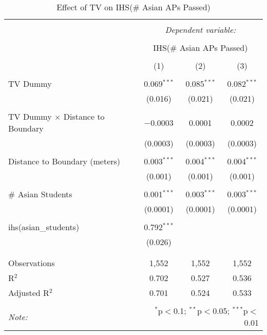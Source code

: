 
\begin{table}[!htbp] \centering 
  \caption{Effect of TV on IHS(\# Asian APs Passed)} 
  \label{} 
\begin{tabular}{@{\extracolsep{-2pt}}lccc} 
\\[-1.8ex]\hline 
\hline \\[-1.8ex] 
 & \multicolumn{3}{c}{\textit{Dependent variable:}} \\ 
\cline{2-4} 
\\[-1.8ex] & \multicolumn{3}{c}{IHS(\# Asian APs Passed)} \\ 
\\[-1.8ex] & (1) & (2) & (3)\\ 
\hline \\[-1.8ex] 
 TV Dummy & 0.069$^{***}$ & 0.085$^{***}$ & 0.082$^{***}$ \\ 
  & (0.016) & (0.021) & (0.021) \\ 
  & & & \\ 
 TV Dummy $\times$ Distance to Boundary & $-$0.0003 & 0.0001 & 0.0002 \\ 
  & (0.0003) & (0.0003) & (0.0003) \\ 
  & & & \\ 
 Distance to Boundary (meters) & 0.003$^{***}$ & 0.004$^{***}$ & 0.004$^{***}$ \\ 
  & (0.001) & (0.001) & (0.001) \\ 
  & & & \\ 
 \# Asian Students & 0.001$^{***}$ & 0.003$^{***}$ & 0.003$^{***}$ \\ 
  & (0.0001) & (0.0001) & (0.0001) \\ 
  & & & \\ 
 ihs(asian\_students) & 0.792$^{***}$ &  &  \\ 
  & (0.026) &  &  \\ 
  & & & \\ 
\hline \\[-1.8ex] 
Observations & 1,552 & 1,552 & 1,552 \\ 
R$^{2}$ & 0.702 & 0.527 & 0.536 \\ 
Adjusted R$^{2}$ & 0.701 & 0.524 & 0.533 \\ 
\hline 
\hline \\[-1.8ex] 
\textit{Note:}  & \multicolumn{3}{r}{$^{*}$p$<$0.1; $^{**}$p$<$0.05; $^{***}$p$<$0.01} \\ 
\end{tabular} 
\end{table} 
